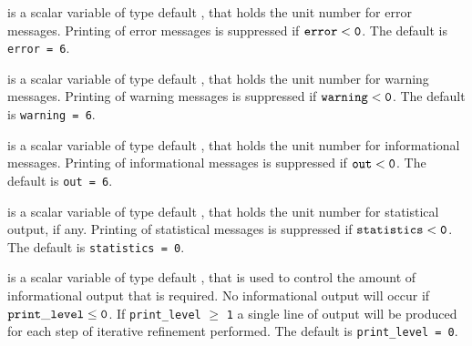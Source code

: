 \documentclass{galahad}
\begin{document}
\begin{description}

 is a scalar variable of type default \integer, that holds the
unit number for error messages.
Printing of error messages is suppressed if ${\tt error} < {\tt 0}$.
The default is {\tt error = 6}.

 is a scalar variable of type default \integer, that holds the
unit number for warning messages.
Printing of warning messages is suppressed if ${\tt warning} < {\tt 0}$.
The default is {\tt warning = 6}.

 is a scalar variable of type default \integer, that holds the
unit number for informational messages.
Printing of informational messages is suppressed if ${\tt out} < {\tt 0}$.
The default is {\tt out = 6}.

 is a scalar variable of type default \integer, that holds the
unit number for statistical output, if any.
Printing of statistical messages is suppressed if ${\tt statistics} < {\tt 0}$.
The default is {\tt statistics = 0}.

 is a scalar variable of type default \integer,
that is used
to control the amount of informational output that is required. No
informational output will occur if ${\tt print\_level} \leq {\tt 0}$. If
{\tt print\_level} $\geq$ {\tt 1} a single line of output will be produced
for each step of iterative refinement performed.
The default is {\tt print\_level = 0}.







\end{description}
\end{document}
